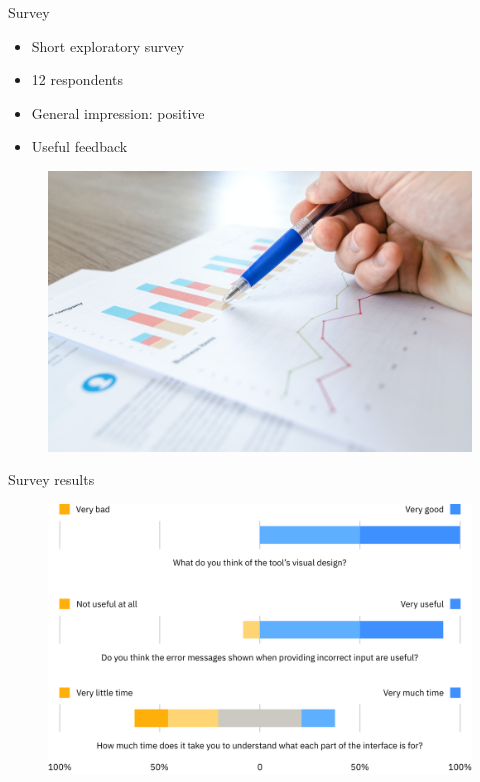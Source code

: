 \documentclass[aspectratio=169]{beamer}
\begin{document}
\begin{frame}[c]{Survey}
    \begin{multicols}{2}
        \begin{itemize}
            \item<1-> Short exploratory survey
            \item<2-> 12 respondents
            \item<3-> General impression: positive
            \item<4-> Useful feedback
        \end{itemize}
        \columnbreak
        \begin{figure}
            \centering
            \includegraphics[width=\linewidth]{images/survey.jpg}
        \end{figure}
    \end{multicols}
\end{frame}
\begin{frame}[c]{Survey results}
    \begin{figure}
        \centering
        \includegraphics[width=.8\linewidth]{images/survey-likert.pdf}
    \end{figure}
\end{frame}
\end{document}
